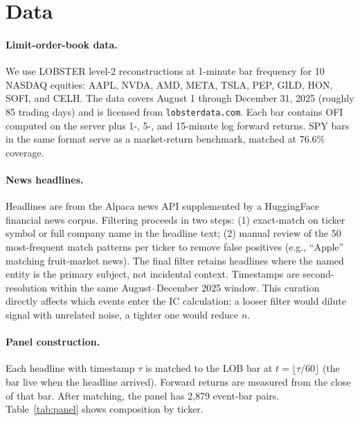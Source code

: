 \documentclass[11pt, letterpaper]{article}
\begin{document}
\section{Data}
\label{sec:data}

\paragraph{Limit-order-book data.} We use LOBSTER level-2 reconstructions at 1-minute
bar frequency for 10 NASDAQ equities: AAPL, NVDA, AMD, META, TSLA, PEP, GILD, HON,
SOFI, and CELH. The data covers August 1 through December 31, 2025 (roughly 85 trading
days) and is licensed from \texttt{lobsterdata.com}. Each bar contains OFI computed on
the server plus 1-, 5-, and 15-minute log forward returns. SPY bars in the same format
serve as a market-return benchmark, matched at 76.6\% coverage.

\paragraph{News headlines.} Headlines are from the Alpaca news API supplemented by
a HuggingFace financial news corpus. Filtering proceeds in two steps: (1) exact-match
on ticker symbol or full company name in the headline text; (2) manual review of the
50 most-frequent match patterns per ticker to remove false positives (e.g., ``Apple''
matching fruit-market news). The final filter retains headlines where the named entity
is the primary subject, not incidental context. Timestamps are second-resolution
within the same August--December 2025 window. This curation directly affects which
events enter the IC calculation; a looser filter would dilute signal with unrelated
noise, a tighter one would reduce $n$.

\paragraph{Panel construction.} Each headline with timestamp $\tau$ is matched to the
LOB bar at $t = \lfloor \tau / 60 \rfloor$ (the bar live when the headline arrived).
Forward returns are measured from the close of that bar. After matching, the panel has
2,879 event-bar pairs. Table~\ref{tab:panel} shows composition by ticker.
\end{document}
